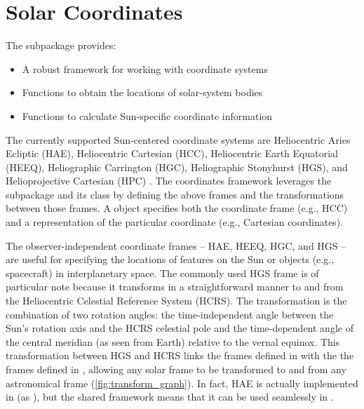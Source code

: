 \section{Solar Coordinates}
\label{sec:coords}

The  subpackage provides:
\begin{itemize}
    \item A robust framework for working with coordinate systems
    \item Functions to obtain the locations of solar-system bodies
    \item Functions to calculate Sun-specific coordinate information
\end{itemize}
The currently supported Sun-centered coordinate systems are Heliocentric Aries Ecliptic (HAE), Heliocentric Cartesian (HCC), Heliocentric Earth Equatorial (HEEQ), Heliographic Carrington (HGC), Heliographic Stonyhurst (HGS), and Helioprojective Cartesian (HPC) \citep[see][]{2006A&A...449..791T}.
The coordinates framework leverages the  subpackage and its  class \citep[see Section 3.3 of][]{astropy2018} by defining the above frames and the transformations between those frames.
A  object specifies both the coordinate frame (e.g., HCC) and a representation of the particular coordinate (e.g., Cartesian coordinates).

The observer-independent coordinate frames -- HAE, HEEQ, HGC, and HGS -- are useful for specifying the locations of features on the Sun or objects (e.g., spacecraft) in interplanetary space.
The commonly used HGS frame is of particular note because it transforms in a straightforward manner to and from the Heliocentric Celestial Reference System (HCRS).
The transformation is the combination of two rotation angles: the time-independent angle between the Sun's rotation axis and the HCRS celestial pole \citep[see][]{2007CeMDA..98..155S} and the time-dependent angle of the central meridian (as seen from Earth) relative to the vernal equinox.
This transformation between HGS and HCRS links the frames defined in  with the the frames defined in , allowing any solar frame to be transformed to and from any astronomical frame (\autoref{fig:transform_graph}).
In fact, HAE is actually implemented in  (as ), but the shared framework means that it can be used seamlessly in \sunpy.

